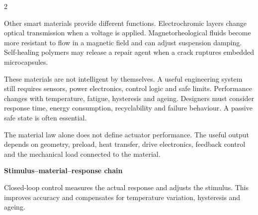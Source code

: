 \begin{multicols}{2}
\begin{ecarticle}
Other smart materials provide different functions. Electrochromic layers change optical transmission
when a voltage is applied. Magnetorheological fluids become more resistant to flow in a magnetic
field and can adjust suspension damping. Self-healing polymers may release a repair agent when a crack
ruptures embedded microcapsules.

These materials are not intelligent by themselves. A useful engineering system still requires
sensors, power electronics, control logic and safe limits. Performance changes with temperature,
fatigue, hysteresis and ageing. Designers must consider response time, energy consumption,
recyclability and failure behaviour. A passive safe state is often essential.
\end{ecarticle}

\begin{tcolorbox}[title=\sffamily\bfseries Engineering Insight,colback=yellow!10,colframe=ECOrange]
The material law alone does not define actuator performance. The useful output depends on geometry,
preload, heat transfer, drive electronics, feedback control and the mechanical load connected to the
material.
\end{tcolorbox}

\begin{engineeringfocus}
\textbf{Stimulus--material--response chain}
\begin{center}
\end{center}
Closed-loop control measures the actual response and adjusts the stimulus. This improves accuracy and
compensates for temperature variation, hysteresis and ageing.
\end{engineeringfocus}


\end{multicols}
